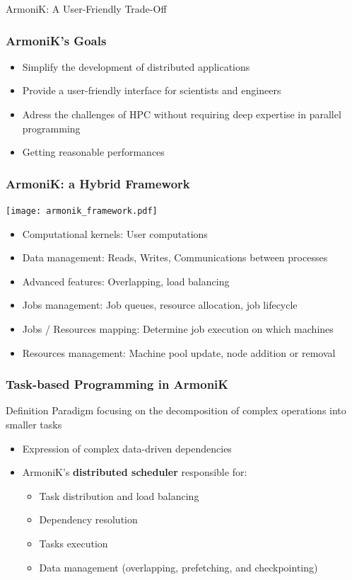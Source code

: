 \documentclass[10pt,aspectratio=1609]{beamer}
\begin{document}
\begin{section}{ArmoniK: A User-Friendly Trade-Off}
 \begin{frame}
   \frametitle{ArmoniK's Goals}
   \begin{itemize}
     \item Simplify the development of distributed applications
     \item Provide a user-friendly interface for scientists and engineers
     \item Adress the challenges of HPC without requiring deep expertise in parallel programming
     \item Getting reasonable performances
   \end{itemize}
 \end{frame}

 \begin{frame}
   \frametitle{ArmoniK: a Hybrid Framework}
   \texttt{[image: armonik\_framework.pdf]}
   \begin{itemize}
     \item Computational kernels: User computations
     \item Data management: Reads, Writes, Communications between processes
     \item Advanced features: Overlapping, load balancing
     \item Jobs management: Job queues, resource allocation, job lifecycle
     \item Jobs / Resources mapping: Determine job execution on which machines
     \item Resources management: Machine pool update, node addition or removal
   \end{itemize}
 \end{frame}

 \begin{frame}
   \frametitle{Task-based Programming in ArmoniK}
   \begin{block}{Definition}
     Paradigm focusing on the decomposition of complex operations into smaller tasks
   \end{block}
   \begin{itemize}
     \item Expression of complex data-driven dependencies
     \item ArmoniK's \textbf{distributed scheduler} responsible for:
           \begin{itemize}
             \item Task distribution and load balancing
             \item Dependency resolution
             \item Tasks execution
             \item Data management (overlapping, prefetching, and checkpointing)
           \end{itemize}
   \end{itemize}
 \end{frame}


\end{section}
\end{document}

